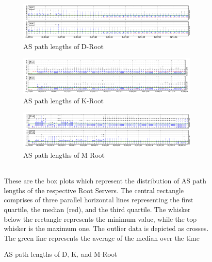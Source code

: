 \begin{figure}
	\begin{subfigure}{1\textwidth}
		\centering
		\includegraphics[width=6.5in]{img/path_avg_all_d.png}
		\caption{AS path lengths of D-Root}
		\label{fig:ch04:trends_avg_path_length_d}
	\end{subfigure}
	\begin{subfigure}{1\textwidth}
		\centering
		\includegraphics[width=6.5in]{img/path_avg_all_k.png}
		\caption{AS path lengths of K-Root}
		\label{fig:ch04:trends_avg_path_length_k}
	\end{subfigure}
	\begin{subfigure}{1\textwidth}
		\centering
		\includegraphics[width=6.5in]{img/path_avg_all_m.png}
		\caption{AS path lengths of M-Root}
		\label{fig:ch04:trends_avg_path_length_m}
	\end{subfigure}
	{\scriptsize \\These are the box plots which represent the distribution of AS path lengths of the respective Root Servers. The central rectangle comprises of three parallel horizontal lines representing the first quartile, the median (red), and the third quartile. The whisker below the rectangle represents the minimum value, while the top whisker is the maximum one. The outlier data is depicted as crosses. The green line represents the average of the median over the time\par}
	\caption{AS path lengths of D, K, and M-Root}
	\label{fig:ch04:trends_avg_path_length}
\end{figure}

